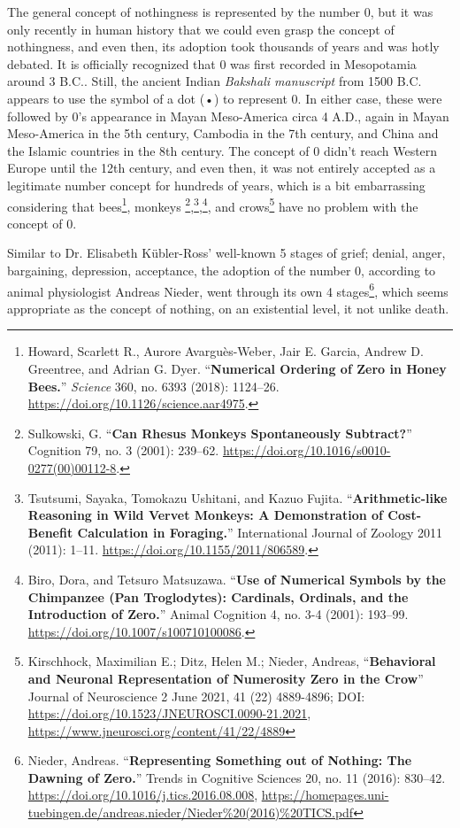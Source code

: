 \documentclass[
]{article}
\begin{document}
The general concept of nothingness is represented by the number 0, but
it was only recently in human history that we could even grasp the
concept of nothingness, and even then, its adoption took thousands of
years and was hotly debated. It is officially recognized that 0 was
first recorded in Mesopotamia around 3 B.C.. Still, the ancient Indian
\emph{Bakshali manuscript} from 1500 B.C. appears to use the symbol of a
dot (•) to represent 0. In either case, these were followed by 0's
appearance in Mayan Meso-America circa 4 A.D., again in Mayan
Meso-America in the 5th century, Cambodia in the 7th century, and China
and the Islamic countries in the 8th century. The concept of 0 didn't
reach Western Europe until the 12th century, and even then, it was not
entirely accepted as a legitimate number concept for hundreds of years,
which is a bit embarrassing considering that bees\footnote{Howard,
  Scarlett R., Aurore Avarguès-Weber, Jair E. Garcia, Andrew D.
  Greentree, and Adrian G. Dyer. ``\textbf{Numerical Ordering of Zero in
  Honey Bees.}'' \emph{Science} 360, no. 6393 (2018): 1124--26.
  \url{https://doi.org/10.1126/science.aar4975}.}, monkeys
\footnote{Sulkowski, G. ``\textbf{Can Rhesus Monkeys Spontaneously
  Subtract?}'' Cognition 79, no. 3 (2001): 239--62.
  \url{https://doi.org/10.1016/s0010-0277(00)00112-8}.},\footnote{Tsutsumi,
  Sayaka, Tomokazu Ushitani, and Kazuo Fujita. ``\textbf{Arithmetic-like
  Reasoning in Wild Vervet Monkeys: A Demonstration of Cost-Benefit
  Calculation in Foraging.}'' International Journal of Zoology 2011
  (2011): 1--11. \url{https://doi.org/10.1155/2011/806589}.},\footnote{Biro,
  Dora, and Tetsuro Matsuzawa. ``\textbf{Use of Numerical Symbols by the
  Chimpanzee (Pan Troglodytes): Cardinals, Ordinals, and the
  Introduction of Zero.}'' Animal Cognition 4, no. 3-4 (2001): 193--99.
  \url{https://doi.org/10.1007/s100710100086}.}, and crows\footnote{Kirschhock,
  Maximilian E.; Ditz, Helen M.; Nieder, Andreas, ``\textbf{Behavioral
  and Neuronal Representation of Numerosity Zero in the Crow}'' Journal
  of Neuroscience 2 June 2021, 41 (22) 4889-4896; DOI:
  \url{https://doi.org/10.1523/JNEUROSCI.0090-21.2021},
  \url{https://www.jneurosci.org/content/41/22/4889}} have no problem
with the concept of 0.

Similar to Dr. Elisabeth Kübler-Ross' well-known 5 stages of grief;
denial, anger, bargaining, depression, acceptance, the adoption of the
number 0, according to animal physiologist Andreas Nieder, went through
its own 4 stages\footnote{Nieder, Andreas. ``\textbf{Representing
  Something out of Nothing: The Dawning of Zero.}'' Trends in Cognitive
  Sciences 20, no. 11 (2016): 830--42.
  \url{https://doi.org/10.1016/j.tics.2016.08.008},
  \url{https://homepages.uni-tuebingen.de/andreas.nieder/Nieder\%20(2016)\%20TICS.pdf}},
which seems appropriate as the concept of nothing, on an existential
level, it not unlike death.
\end{document}
